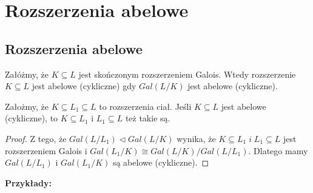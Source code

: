 \section{Rozszerzenia abelowe}
\subsection{Rozszerzenia abelowe}
\setcounter{theorem}{2}

\begin{bbox}
Załóżmy, że $K\subseteq L$ jest skończonym rozszerzeniem Galois. Wtedy rozszerzenie $K\subseteq L$ jest abelowe (cykliczne) gdy $Gal(L/K)$ jest abelowe (cykliczne).
\end{bbox}

\begin{theorem}
    Założmy, że $K\subseteq L_1\subseteq L$ to rozszerzenia ciał. Jeśli $K\subseteq L$ jest abelowe (cykliczne), to $K\subseteq L_1$ i $L_1\subseteq L$ też takie są.
\end{theorem}
\begin{proof}
Z tego, że $Gal(L/L_1)\triangleleft Gal(L/K)$ wynika, że $K\subseteq L_1\;i\;L_1\subseteq L$ jest rozszerzeniem Galois i $Gal(L_1/K)\cong Gal(L/K)/Gal(L/L_1)$. Dlatego mamy $Gal(L/L_1)$ i $Gal(L_1/K)$ są abelowe (cykliczne).
\end{proof}

\textbf{Przykłady:}

